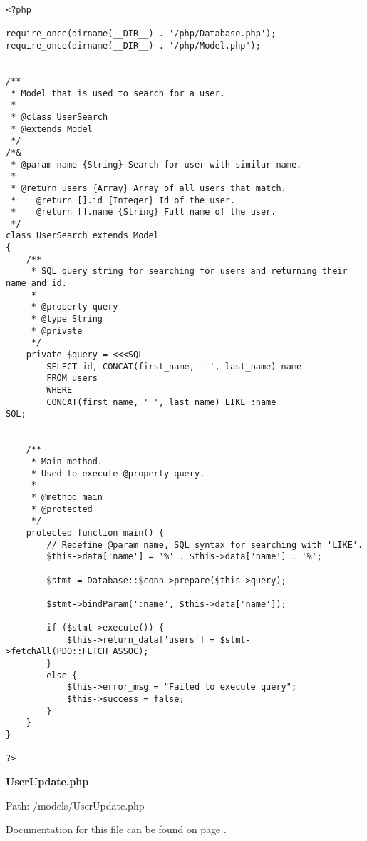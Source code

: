 {\scriptsize
\begin{lstlisting}
<?php

require_once(dirname(__DIR__) . '/php/Database.php');
require_once(dirname(__DIR__) . '/php/Model.php');


/**
 * Model that is used to search for a user.
 *
 * @class UserSearch
 * @extends Model
 */
/*&
 * @param name {String} Search for user with similar name.
 *
 * @return users {Array} Array of all users that match.
 *    @return [].id {Integer} Id of the user.
 *    @return [].name {String} Full name of the user.
 */
class UserSearch extends Model
{
	/**
	 * SQL query string for searching for users and returning their name and id.
	 *
	 * @property query
	 * @type String
	 * @private
	 */
	private $query = <<<SQL
		SELECT id, CONCAT(first_name, ' ', last_name) name
		FROM users
		WHERE
		CONCAT(first_name, ' ', last_name) LIKE :name
SQL;


	/**
	 * Main method.
	 * Used to execute @property query.
	 *
	 * @method main
	 * @protected
	 */
	protected function main() {
		// Redefine @param name, SQL syntax for searching with 'LIKE'.
		$this->data['name'] = '%' . $this->data['name'] . '%';

		$stmt = Database::$conn->prepare($this->query);
		
		$stmt->bindParam(':name', $this->data['name']);

		if ($stmt->execute()) {
			$this->return_data['users'] = $stmt->fetchAll(PDO::FETCH_ASSOC);
		}
		else {
			$this->error_msg = "Failed to execute query";
			$this->success = false;
		}
	}
}

?>
\end{lstlisting}
}
\textbf{UserUpdate.php}\label{UserUpdate.php}

Path: /models/UserUpdate.php

Documentation for this file can be found on page \pageref{UserUpdate.php.doc}.

